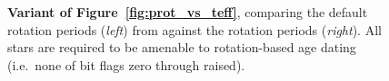 \documentclass[11pt,twocolumn,tighten]{aastex63}
\begin{document}
\begin{figure}[!t]
	\begin{center}
	\end{center}
	\vspace{-0.6cm}
	\caption{
    {\bf Variant of Figure~\ref{fig:prot_vs_teff}}, comparing the default
    rotation periods ({\it left}) from \citet{Santos_2019,Santos_2021}
    against the \citet{McQuillan_2014} rotation periods ({\it right}).
    All stars are required to be amenable to rotation-based age dating
    (i.e.~none of bit flags zero through  raised).
	}
	\label{fig:prot_vs_teff_mcq}
\end{figure}
\end{document}
